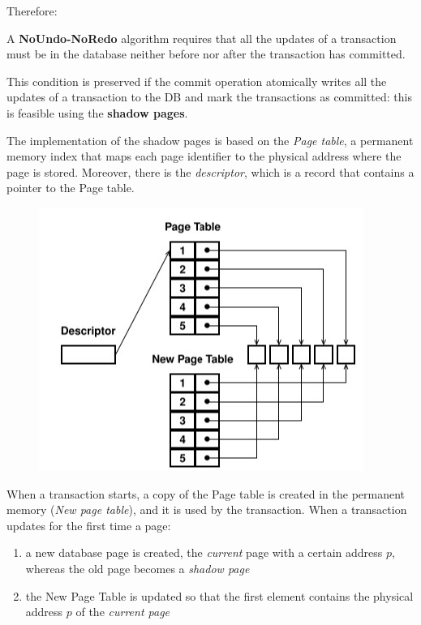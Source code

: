 Therefore:

\begin{tcolorbox}
     A \textbf{NoUndo-NoRedo} algorithm requires that all the updates of a transaction must be in the database neither before nor after the transaction has committed.
\end{tcolorbox}

This condition is preserved if the commit operation atomically writes all the updates of a transaction to the DB and mark the transactions as committed: this is feasible using the \textbf{shadow pages}. 

The implementation of the shadow pages is based on the \textit{Page table}, a permanent memory index that maps each page identifier to the physical address where the page is stored. Moreover, there is the \textit{descriptor}, which is a record that contains a pointer to the Page table.

\begin{figure}[h!]
		\centering
		\includegraphics[scale = 1.3]{img/tr6.jpg}
		\label{tr2}
\end{figure}

When a transaction starts, a copy of the Page table is created in the permanent memory (\textit{New page table}), and it is used by the transaction. When a transaction updates for the first time a page: 

\begin{enumerate}
    \item a new database page is created, the \textit{current} page with a certain address $p$, whereas the old page becomes a \textit{shadow page}
    
    \item the New Page Table is updated so that the first element contains the physical address $p$ of the \textit{current page}
\end{enumerate}

